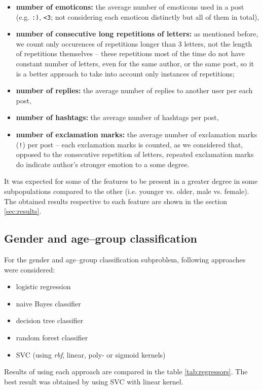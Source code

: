 \documentclass[10pt, a4paper]{article}
\begin{document}
\begin{itemize}
	\item \textbf{number of emoticons:} the average number of emoticons used in a post (e.g. \verb|:)|, \verb|<3|; not considering each emoticon distinctly but all of them in total),
	\item \textbf{number of consecutive long repetitions of letters:} as mentioned before, we count only occurences of repetitions longer than 3 letters, not the length of repetitions themselves -- these repetitions most of the time do not have constant number of letters, even for the same author, or the same post, so it is a better approach to take into account only instances of repetitions;
	\item \textbf{number of replies:} the average number of replies to another user per each post,
	\item \textbf{number of hashtags:} the average number of hashtags per post,
	\item \textbf{number of exclamation marks:} the average number of exclamation marks (\verb|!|) per post -- each exclamation marks is counted, as we considered that, opposed to the consecutive repetition of letters, repeated exclamation marks do indicate author's stronger emotion to a some degree.
\end{itemize}

It was expected for some of the features to be present in a greater degree in some subpopulations compared to the other (i.e. younger vs. older, male vs. female). The obtained results respective to each feature are shown in the section \ref{sec:results}.

\subsection{Gender and age--group classification}

For the gender and age--group classification subproblem, following approaches were considered:
\begin{itemize}
	\item logistic regression
	\item naive Bayes classifier
	\item decision tree classifier
	\item random forest classifier
	\item SVC (using \textit{rbf}, linear, poly- or sigmoid kernels)
\end{itemize}
\noindent Results of using each approach are compared in the table \ref{tab:regressors}. The best result was obtained by using SVC with linear kernel.
\end{document}
